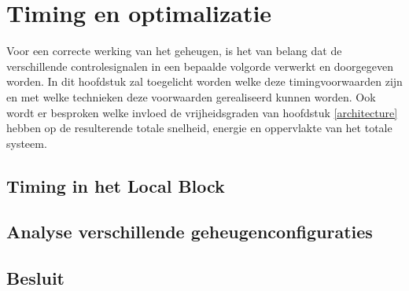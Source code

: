 \chapter{Timing en optimalizatie}
\label{timing-optimization}
Voor een correcte werking van het geheugen, is het van belang dat de verschillende controlesignalen in een bepaalde volgorde verwerkt en doorgegeven worden.
In dit hoofdstuk zal toegelicht worden welke deze timingvoorwaarden zijn en met welke technieken deze voorwaarden gerealiseerd kunnen worden.
Ook wordt er besproken welke invloed de vrijheidsgraden van hoofdstuk \ref{architecture} hebben op de resulterende totale snelheid, energie en oppervlakte van het totale systeem. 

\section{Timing in het Local Block}

\section{Analyse verschillende geheugenconfiguraties}


\section{Besluit}
